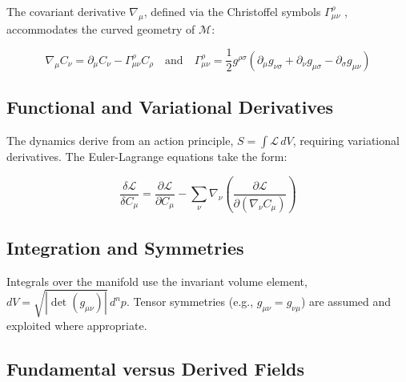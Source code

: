 The covariant derivative \(\nabla_\mu\), defined via the Christoffel symbols \(\Gamma^\rho_{\mu\nu}\) \autocite{Christoffel1869}, accommodates the curved geometry of \(\mathcal{M}\):

\begin{equation}
\nabla_\mu C_\nu = \partial_\mu C_\nu - \Gamma^\rho_{\mu\nu} C_\rho \quad \text{and} \quad \Gamma^\rho_{\mu\nu} = \frac{1}{2} g^{\rho\sigma} ( \partial_\mu g_{\nu\sigma} + \partial_\nu g_{\mu\sigma} - \partial_\sigma g_{\mu\nu} )
\end{equation}


\subsection{Functional and Variational Derivatives}
\label{2.4.4:functional_and_variational_derivatives}

The dynamics derive from an action principle, \(S = \int \mathcal{L} \, dV\), requiring variational derivatives. The Euler-Lagrange equations take the form:

\begin{equation}
\frac{\delta \mathcal{L}}{\delta C_\mu} = \frac{\partial \mathcal{L}}{\partial C_\mu} - \sum_\nu \nabla_\nu \left( \frac{\partial \mathcal{L}}{\partial (\nabla_\nu C_\mu)} \right)
\end{equation}


\subsection{Integration and Symmetries}
\label{2.4.5:integration_and_symmetries}

Integrals over the manifold use the invariant volume element, \(dV = \sqrt{|\det(g_{\mu\nu})|} \, d^n p\). Tensor symmetries (e.g., \(g_{\mu\nu} = g_{\nu\mu}\)) are assumed and exploited where appropriate.


\subsection{Fundamental versus Derived Fields}
\label{2.4.6:fundamental_versus_derived_fields}

